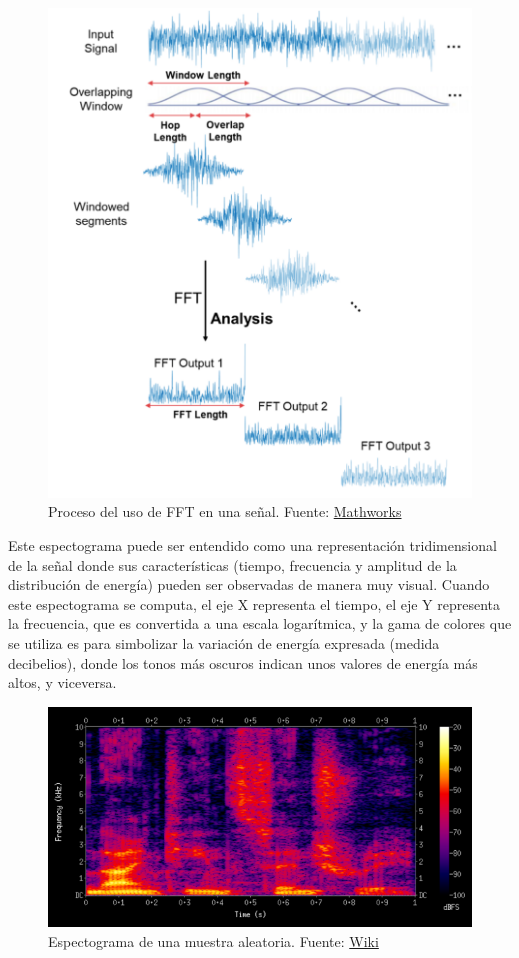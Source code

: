 \documentclass[11pt,a4paper,spanish]{book}
\begin{document}
	\begin{figure}[H]
		\centering
		\includegraphics[scale=0.25]{processFFT.png} 
		\caption{Proceso del uso de FFT en una señal. Fuente: \href{https://www.mathworks.com/help/dsp/ref/dsp.stft.html}{Mathworks}}
	\end{figure} 
	
	
	Este espectograma puede ser entendido como una representación tridimensional de la señal donde sus características (tiempo, frecuencia y amplitud de la distribución de energía) pueden ser observadas de manera muy visual. Cuando este espectograma se computa, el eje X representa el tiempo, el eje Y representa la frecuencia, que es convertida a una escala logarítmica, y la gama de colores que se utiliza es para simbolizar la variación de energía expresada (medida decibelios), donde los tonos más oscuros indican unos valores de energía más altos, y viceversa.
	
	\begin{figure}[h]
		\centering
		\includegraphics[scale=0.25]{spectogram.png} 
		\caption{Espectograma de una muestra aleatoria. Fuente: \href{https://es.other.wiki/wiki/Spectrogram}{Wiki}}
	\end{figure}
	
\end{document}
